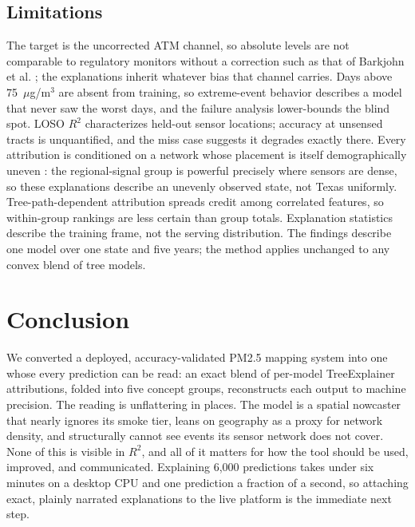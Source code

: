\documentclass[conference]{IEEEtran}
\newcommand{\ugm}{$\mu$g/m$^3$}
\begin{document}
\subsection{Limitations} The target is the uncorrected ATM channel, so
absolute levels are not comparable to regulatory monitors without a
correction such as that of Barkjohn et al. \cite{barkjohn2021}; the
explanations inherit whatever bias that channel carries. Days above
75~\ugm{} are absent from training, so extreme-event behavior describes a
model that never saw the worst days, and the failure analysis lower-bounds
the blind spot. LOSO $R^2$ characterizes held-out sensor locations;
accuracy at unsensed tracts is unquantified, and the miss case suggests it
degrades exactly there. Every attribution is conditioned on a network whose
placement is itself demographically uneven \cite{desouza2021}: the
regional-signal group is powerful precisely where sensors are dense, so
these explanations describe an unevenly observed state, not Texas
uniformly.
Tree-path-dependent attribution spreads credit among correlated
features, so within-group rankings are less certain than group totals. Explanation statistics describe the training frame, not the
serving distribution. The findings describe one model over one state and
five years; the method applies unchanged to any convex blend of tree
models.

\balance
\section{Conclusion}
We converted a deployed, accuracy-validated PM2.5 mapping system into one
whose every prediction can be read: an exact blend of per-model
TreeExplainer attributions, folded into five concept groups, reconstructs
each output to machine precision. The reading is unflattering in
places. The model is a spatial nowcaster that nearly ignores its smoke
tier, leans on geography as a proxy for network density, and structurally
cannot see events its sensor network does not cover. None of this is
visible in $R^2$, and all of it matters for how the tool should be used,
improved, and communicated. Explaining 6,000 predictions takes under six minutes
on a desktop CPU and one prediction a fraction of a second, so attaching
exact, plainly narrated explanations to the live platform is the immediate
next step.



\end{document}
